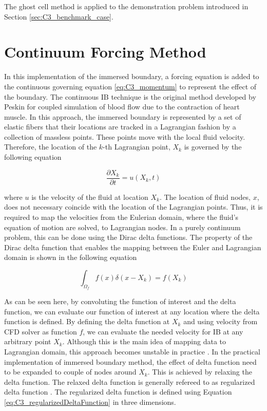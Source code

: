 The ghost cell method is applied to the demonstration problem introduced in Section \ref{sec:C3_benchmark_case}.
\section{Continuum Forcing Method}
In this implementation of the immersed boundary, a forcing equation is added to the continuous governing equation \eqref{eq:C3_momentum} to represent the effect of the boundary. The continuous IB technique is the original method developed by Peskin \cite{peskin1972flow} for coupled simulation of blood flow due to the contraction of heart muscle. In this approach, the immersed boundary is represented by a set of elastic fibers that their locations are tracked in a Lagrangian fashion by a collection of massless points. These points move with the local fluid velocity. Therefore, the location of the $k$-th Lagrangian point, $X_k$ is governed by the following equation

\begin{equation}
	\frac{\partial X_k}{\partial t} = u(X_k, t)
\end{equation}

where $u$ is the velocity of the fluid at location $X_k$. The location of fluid nodes, $x$, does not necessary coincide with the location of the Lagrangian points. Thus, it is required to map the velocities from the Eulerian domain, where the fluid's equation of motion are solved, to Lagrangian nodes. In a purely continuum problem, this can be done using the Dirac delta functions. The property of the Dirac delta function that enables the mapping between the Euler and Lagrangian domain is shown in the following equation

\begin{equation}
	\int_{\Omega_f} f(x) \delta(x - X_k) = f(X_k)
\end{equation}

As can be seen here, by convoluting the function of interest and the delta function, we can evaluate our function of interest at any location where the delta function is defined. By defining the delta function at $X_k$ and using velocity from CFD solver as function $f$, we can evaluate the needed velocity for IB at any arbitrary point $X_k$. Although this is the main idea of mapping data to Lagrangian domain, this approach becomes unstable in practice \cite{lee2003stability}. In the practical implementation of immersed boundary method, the effect of delta function need to be expanded to couple of nodes around $X_k$. This is achieved by relaxing the delta function. The relaxed delta function is generally refereed to as regularized delta function \cite{shin2008assessment}. The regularized delta function is defined using Equation \eqref{eq:C3_regularizedDeltaFunction} in three dimensions.

